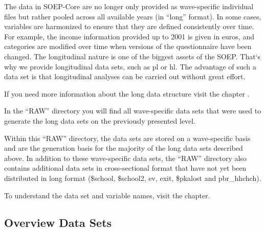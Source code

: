\documentclass[letterpaper,10pt,openany,onesideH,english]{sphinxmanual}
\begin{document}
The data in SOEP-Core are no longer only provided as wave-specific individual files but rather pooled across all available years (in “long” format). In some cases, variables are harmonized to ensure that they are defined consistently over time. For example, the income information provided up to 2001 is given in euros, and categories are modified over time when versions of the questionnaire have been changed. The longitudinal nature is one of the biggest assets of the SOEP. That{}`s why we provide longitudinal data sets, such as pl or hl. The advantage of such a data set is that longitudinal analyses can be carried out without great effort.

If you need more information about the long data structure visit the chapter {\hyperref[\detokenize{Principles of Data Structure/index:datasets-long}]{}}.

In the “RAW” directory you will find all wave-specific data sets that were used to generate the long data sets on the previously presented level.

\begin{figure}[H]
\centering

\noindent{}
\end{figure}

\begin{figure}[H]
\centering

\noindent{}
\end{figure}

Within this “RAW” directory, the data sets are stored on a wave-specific basis and are the generation basis for the majority of the long data sets described above. In addition to these wave-specific data sets, the “RAW” directory also contains additional data sets in cross-sectional format that have not yet been distributed in long format (\$school, \$school2, ev, exit, \$pkalost and pbr\_hhchch).

To understand the data set and variable names, visit the {\hyperref[\detokenize{Principles of Data Structure/index:label}]{}} chapter.


\subsection{Overview Data Sets}
\label{\detokenize{Principles of Data Structure/index:overview-data-sets}}\label{\detokenize{Principles of Data Structure/index:overview}}
\end{document}
